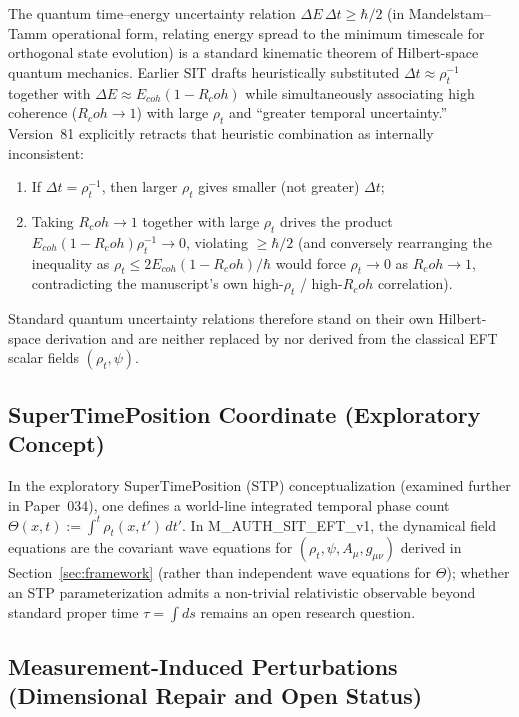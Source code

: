 \documentclass[american,11pt,letterpaper]{article}
\newcommand{\Rcoh}{R_{\mathrm{coh}}}
\def\mathrm#1{#1}%
\def\texttt#1{#1}%
\def\emph#1{#1}%
\def\Rcoh{R_coh}%
\begin{document}
The quantum time--energy uncertainty relation $\Delta E\,\Delta t \ge \hbar/2$ (in Mandelstam--Tamm operational form, relating energy spread to the minimum timescale for orthogonal state evolution) is a standard kinematic theorem of Hilbert-space quantum mechanics. Earlier SIT drafts heuristically substituted $\Delta t \approx \rho_t^{-1}$ together with $\Delta E \approx E_{\mathrm{coh}}(1 - \Rcoh)$ while simultaneously associating high coherence ($\Rcoh \to 1$) with large $\rho_t$ and ``greater temporal uncertainty.'' Version~81 explicitly retracts that heuristic combination as internally inconsistent:
\begin{enumerate}[leftmargin=2em]
  \item If $\Delta t = \rho_t^{-1}$, then larger $\rho_t$ gives \emph{smaller} (not greater) $\Delta t$;
  \item Taking $\Rcoh \to 1$ together with large $\rho_t$ drives the product $E_{\mathrm{coh}}(1 - \Rcoh)\rho_t^{-1} \to 0$, violating $\ge \hbar/2$ (and conversely rearranging the inequality as $\rho_t \le 2E_{\mathrm{coh}}(1 - \Rcoh)/\hbar$ would force $\rho_t \to 0$ as $\Rcoh \to 1$, contradicting the manuscript's own high-$\rho_t$ / high-$\Rcoh$ correlation).
\end{enumerate}
Standard quantum uncertainty relations therefore stand on their own Hilbert-space derivation and are neither replaced by nor derived from the classical EFT scalar fields $(\rho_t, \psi)$.

\subsection{SuperTimePosition Coordinate (Exploratory Concept)}
\label{sec:stp}

In the exploratory SuperTimePosition (STP) conceptualization (examined further in Paper~034), one defines a world-line integrated temporal phase count $\Theta(x,t) := \int^t \rho_t(x,t')\,dt'$. In \texttt{M\_AUTH\_SIT\_EFT\_v1}, the dynamical field equations are the covariant wave equations for $(\rho_t, \psi, A_\mu, g_{\mu\nu})$ derived in Section~\ref{sec:framework} (rather than independent wave equations for $\Theta$); whether an STP parameterization admits a non-trivial relativistic observable beyond standard proper time $\tau = \int ds$ remains an open research question.

\subsection{Measurement-Induced Perturbations (Dimensional Repair and Open Status)}
\label{sec:measurement}
\end{document}
